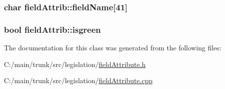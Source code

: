 \label{classfield_attrib_ada4309ce9c7a4a43949c7328ea354ae3}
\hypertarget{classfield_attrib_a24ece0b54d20913e88bcdb5c0a7bb35d}{
\subsubsection[{fieldName}]{\setlength{\rightskip}{0pt plus 5cm}char {\bf fieldAttrib::fieldName}\mbox{[}41\mbox{]}}}
\label{classfield_attrib_a24ece0b54d20913e88bcdb5c0a7bb35d}
\hypertarget{classfield_attrib_a135b7abba9c0136841f04ac3e65321fb}{
\subsubsection[{isgreen}]{\setlength{\rightskip}{0pt plus 5cm}bool {\bf fieldAttrib::isgreen}}}
\label{classfield_attrib_a135b7abba9c0136841f04ac3e65321fb}


The documentation for this class was generated from the following files:\begin{DoxyCompactItemize}
\item 
C:/main/trunk/src/legislation/\hyperlink{field_attribute_8h}{fieldAttribute.h}\item 
C:/main/trunk/src/legislation/\hyperlink{field_attribute_8cpp}{fieldAttribute.cpp}\end{DoxyCompactItemize}
